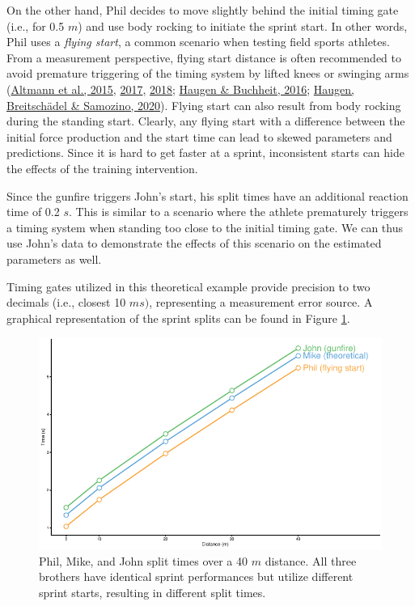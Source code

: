 \documentclass[fleqn,10pt,lineno]{wlpeerj} %
\begin{document}
On the other hand, Phil decides to move slightly behind the initial timing gate (i.e., for 0.5 \(m\)) and use body rocking to initiate the sprint start. In other words, Phil uses a \emph{flying start}, a common scenario when testing field sports athletes. From a measurement perspective, flying start distance is often recommended to avoid premature triggering of the timing system by lifted knees or swinging arms (\protect\hyperlink{ref-altmannDifferentStartingDistances2015}{Altmann et al., 2015}, \protect\hyperlink{ref-altmannValiditySingleBeamTiming2017}{2017}, \protect\hyperlink{ref-altmannAccuracySingleBeam2018}{2018}; \protect\hyperlink{ref-haugenSprintRunningPerformance2016}{Haugen \& Buchheit, 2016}; \protect\hyperlink{ref-haugenPowerForceVelocityProfilingSprinting2020}{Haugen, Breitschädel \& Samozino, 2020}). Flying start can also result from body rocking during the standing start. Clearly, any flying start with a difference between the initial force production and the start time can lead to skewed parameters and predictions. Since it is hard to get faster at a sprint, inconsistent starts can hide the effects of the training intervention.

Since the gunfire triggers John's start, his split times have an additional reaction time of 0.2 \(s\). This is similar to a scenario where the athlete prematurely triggers a timing system when standing too close to the initial timing gate. We can thus use John's data to demonstrate the effects of this scenario on the estimated parameters as well.

Timing gates utilized in this theoretical example provide precision to two decimals (i.e., closest 10 \(ms)\), representing a measurement error source. A graphical representation of the sprint splits can be found in Figure \ref{fig:mike-phil-john-split-times}.



\begin{figure}

{\centering \includegraphics[width=0.9\linewidth]{shorts-simulation-paper_files/figure-latex/mike-phil-john-split-times-1} 

}

\caption{Phil, Mike, and John split times over a 40 \(m\) distance. All three brothers have identical sprint performances but utilize different sprint starts, resulting in different split times.}\label{fig:mike-phil-john-split-times}
\end{figure}
\end{document}
